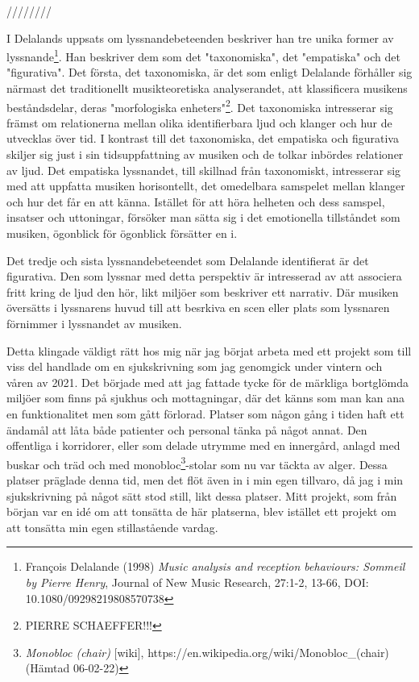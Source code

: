 \documentclass{article}
\begin{document}



////////

I Delalands uppsats om lyssnandebeteenden beskriver han tre unika former av lyssnande\footnote{François
Delalande (1998) \emph{Music analysis and reception behaviours: Sommeil by Pierre Henry}, Journal of New Music
Research, 27:1-2, 13-66, DOI: 10.1080/09298219808570738}. Han beskriver dem som det "taxonomiska", det
"empatiska" och det "figurativa". Det första, det taxonomiska, är det som enligt Delalande förhåller sig
närmast det traditionellt musikteoretiska analyserandet, att klassificera musikens beståndsdelar, deras
"morfologiska enheters"\footnote{PIERRE SCHAEFFER!!!}. Det taxonomiska intresserar sig främst om relationerna
mellan olika identifierbara ljud och klanger och hur de utvecklas över tid. I kontrast till det taxonomiska,
det empatiska och figurativa skiljer sig just i sin tidsuppfattning av musiken och de tolkar inbördes
relationer av ljud. Det empatiska lyssnandet, till skillnad från taxonomiskt, intresserar sig med att
uppfatta musiken horisontellt, det omedelbara samspelet mellan klanger och hur det får en att känna. Istället
för att höra helheten och dess samspel, insatser och uttoningar, försöker man sätta sig i det emotionella
tillståndet som musiken, ögonblick för ögonblick försätter en i. 


Det tredje och sista lyssnandebeteendet som
Delalande identifierat är det figurativa. Den som lyssnar med detta perspektiv är intresserad av att associera
fritt kring de ljud den hör, likt miljöer som beskriver ett narrativ. Där musiken översätts i lyssnarens huvud
till att besrkiva en scen eller plats som lyssnaren förnimmer i lyssnandet av musiken. 

Detta klingade väldigt rätt hos mig när jag börjat arbeta med ett projekt som till viss del handlade om en
sjukskrivning som jag genomgick under vintern och våren av 2021. Det började med att jag fattade tycke för de
märkliga bortglömda miljöer som finns på sjukhus och mottagningar, där det känns som man kan ana en
funktionalitet men som gått förlorad. Platser som någon gång i tiden haft ett ändamål att låta både patienter
och personal tänka på något annat. Den offentliga i korridorer, eller som delade utrymme med
en innergård, anlagd med buskar och träd och med monobloc\footnote{\emph{Monobloc
(chair)} [wiki], https://en.wikipedia.org/wiki/Monobloc\_(chair) (Hämtad 06-02-22)}-stolar som nu var täckta av
alger. Dessa platser präglade denna tid, men det flöt även in i min egen tillvaro, då jag i min sjukskrivning
på något sätt stod still, likt dessa platser. Mitt projekt, som från början var en idé om att tonsätta de här
platserna, blev istället ett projekt om att tonsätta min egen stillastående vardag. 
\end{document}
